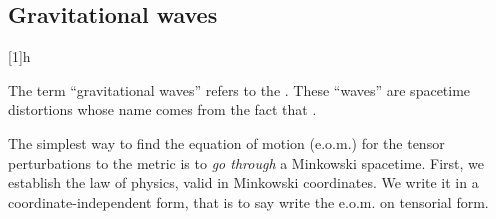 \begin{draft}
{        %
    
            \begin{table}[h]\label[tab]{tab:CFTgrav:conformal_trafos:untit}
                {untitled_090224.tex}
            \end{table}
            
        }
    \end{draft}
    
    
    
    
    \begin{draft}
        {
            \section*{Gravitational waves}
    
    \newcommand*{\Chr}[2]{\ChristoffelSym{#1}{#2}}  %
    \newcommand*{\barChr}[2]{%
        \ChristoffelSym[\widebar{\Gamma}]{#1}{#2}}  %
    \newcommand*{\barg}{\widebar{g}}                %
    [1]{h}
    \newcommand*{\piG}{\ppi G\nped{N}}
    \newcommand*{\Lam}[2]{\ProjectionLambda{#1}{#2}}%
    
    
    
    
    
    
    
    The term ``gravitational waves'' refers to the . These ``waves'' are spacetime \normalsize{distortions} whose name comes from the fact that .
    
    The simplest way to find the equation of motion (e.o.m.) for the tensor perturbations to the metric is to \textit{go through} a Minkowski spacetime. First, we establish the law of physics, valid in Minkowski coordinates. We write it in a coordinate-independent form, that is to say write the e.o.m. on tensorial form.  
    
}
\end{draft}
